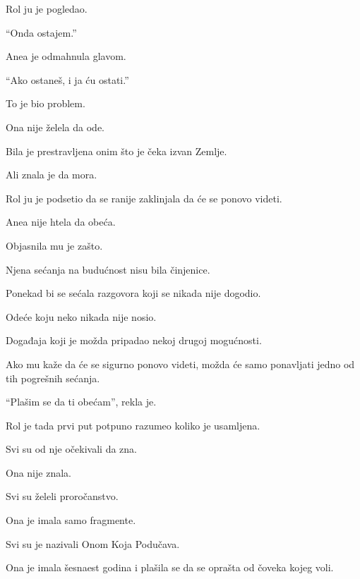 \bigskip

Rol ju je pogledao.

``Onda ostajem.''

\bigskip

Anea je odmahnula glavom.

``Ako ostaneš, i ja ću ostati.''

\bigskip

To je bio problem.

\bigskip

Ona nije želela da ode.

Bila je prestravljena onim što je čeka izvan Zemlje.

Ali znala je da mora.

\bigskip

Rol ju je podsetio da se ranije zaklinjala da će se ponovo videti.

Anea nije htela da obeća.

\bigskip

Objasnila mu je zašto.

\bigskip

Njena sećanja na budućnost nisu bila činjenice.

Ponekad bi se sećala razgovora koji se nikada nije dogodio.

Odeće koju neko nikada nije nosio.

Događaja koji je možda pripadao nekoj drugoj mogućnosti.

\bigskip

Ako mu kaže da će se sigurno ponovo videti, možda će samo ponavljati jedno od tih pogrešnih sećanja.

\bigskip

``Plašim se da ti obećam'', rekla je.

\bigskip

Rol je tada prvi put potpuno razumeo koliko je usamljena.

\bigskip

Svi su od nje očekivali da zna.

Ona nije znala.

\bigskip

Svi su želeli proročanstvo.

Ona je imala samo fragmente.

\bigskip

Svi su je nazivali Onom Koja Podučava.

Ona je imala šesnaest godina i plašila se da se oprašta od čoveka kojeg voli.

\bigskip

